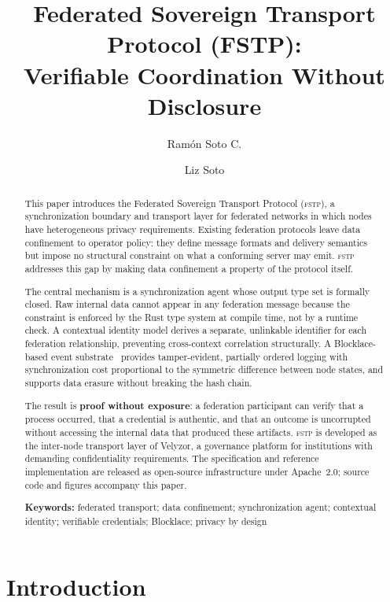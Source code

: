 \documentclass[12pt]{article}
\title{
	\textbf{Federated Sovereign Transport Protocol (FSTP):}\\
	\textbf{Verifiable Coordination Without Disclosure}
}
\author[1]{Ram\'on Soto C.}
\author[2]{Liz Soto}
\affil[1]{Department of Accounting, University of Sonora,
          Hermosillo, Sonora, Mexico \\ \nolinkurl{ramon.soto@unison.mx}}
\affil[2]{Department of Mathematics, University of Sonora,
	Hermosillo, Sonora, Mexico}
\date{}
\newcommand{\FSTP}{\textsc{fstp}}
\begin{document}
	\maketitle
	
	\begin{abstract}
		This paper introduces the Federated Sovereign Transport Protocol (\FSTP{}),
		a synchronization boundary and transport layer for federated networks
		in which nodes have heterogeneous privacy requirements. Existing
		federation protocols leave data confinement to operator policy: they
		define message formats and delivery semantics but impose no structural
		constraint on what a conforming server may emit. \FSTP{} addresses this
		gap by making data confinement a property of the protocol itself.
		
		The central mechanism is a synchronization agent whose output type set
		is formally closed. Raw internal data cannot appear in any federation
		message because the constraint is enforced by the Rust type system at
		compile time, not by a runtime check. A contextual identity model
		derives a separate, unlinkable identifier for each federation
		relationship, preventing cross-context correlation structurally. A
		Blocklace-based event substrate~\cite{shapiro2023grassroots,keidar2023cordial}
		provides tamper-evident, partially ordered logging with synchronization
		cost proportional to the symmetric difference between node states,
		and supports data erasure without breaking the hash chain.
		
		The result is \textbf{proof without exposure}: a federation participant
		can verify that a process occurred, that a credential is authentic, and
		that an outcome is uncorrupted without accessing the internal data that
		produced these artifacts. \FSTP{} is developed as the inter-node
		transport layer of Velyzor, a governance platform for institutions with
		demanding confidentiality requirements. The specification and reference
		implementation are released as open-source infrastructure under
		Apache~2.0; source code and figures accompany this paper.
		
		\noindent\textbf{Keywords:} federated transport; data confinement;
		synchronization agent; contextual identity; verifiable credentials;
		Blocklace; privacy by design
	\end{abstract}
	
	
	\section{Introduction}
	\label{sec:intro}
	
\end{document}
